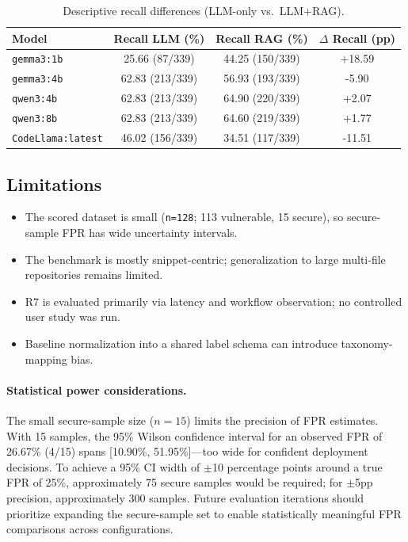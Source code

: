 \begin{table}[H]
  \centering
  \caption{Descriptive recall differences (LLM-only vs.\ LLM+RAG).}
  \label{tab:eval-recall-delta}
  \small
  \begin{tabular}{lccc}
    \toprule
    Model & Recall LLM (\%) & Recall RAG (\%) & $\Delta$ Recall (pp) \\
    \midrule
    \texttt{gemma3:1b} & 25.66 (87/339) & 44.25 (150/339) & +18.59 \\
    \texttt{gemma3:4b} & 62.83 (213/339) & 56.93 (193/339) & -5.90 \\
    \texttt{qwen3:4b} & 62.83 (213/339) & 64.90 (220/339) & +2.07 \\
    \texttt{qwen3:8b} & 62.83 (213/339) & 64.60 (219/339) & +1.77 \\
    \texttt{CodeLlama:latest} & 46.02 (156/339) & 34.51 (117/339) & -11.51 \\
    \bottomrule
  \end{tabular}
\end{table}

\subsection*{Limitations}

\begin{itemize}
  \item The scored dataset is small (\texttt{n=128}; 113 vulnerable, 15 secure), so secure-sample FPR has wide uncertainty intervals.
  \item The benchmark is mostly snippet-centric; generalization to large multi-file repositories remains limited.
  \item R7 is evaluated primarily via latency and workflow observation; no controlled user study was run.
  \item Baseline normalization into a shared label schema can introduce taxonomy-mapping bias.
\end{itemize}

\paragraph{Statistical power considerations.}
The small secure-sample size ($n=15$) limits the precision of FPR estimates. With 15 samples, the 95\% Wilson confidence interval for an observed FPR of 26.67\% (4/15) spans [10.90\%, 51.95\%]—too wide for confident deployment decisions. To achieve a 95\% CI width of $\pm$10 percentage points around a true FPR of 25\%, approximately 75 secure samples would be required; for $\pm$5pp precision, approximately 300 samples. Future evaluation iterations should prioritize expanding the secure-sample set to enable statistically meaningful FPR comparisons across configurations.

